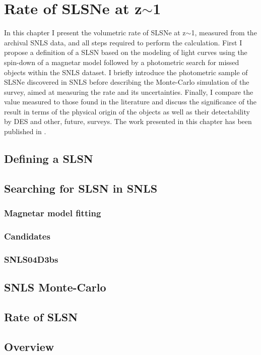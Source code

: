 \chapter{Rate of SLSNe at z$\sim$1} 
\label{Chapter3}

In this chapter I present the volumetric rate of SLSNe at z$\sim$1, measured from the archival SNLS data, and all steps required to perform the calculation. First I propose a definition of a SLSN based on the modeling of light curves using the spin-down of a magnetar model followed by a photometric search for missed objects within the SNLS dataset. I briefly introduce the photometric sample of SLSNe discovered in SNLS before describing the Monte-Carlo simulation of the survey, aimed at measuring the rate and its uncertainties. Finally, I compare the value measured to those found in the literature and discuss the significance of the result in terms of the physical origin of the objects as well as their detectability by DES and other, future, surveys. The work presented in this chapter has been published in \citet{Prajs2016}.

\section{Defining a SLSN}

\section{Searching for SLSN in SNLS}
\subsection{Magnetar model fitting}
\subsection{Candidates}
\subsection{SNLS04D3bs}

\section{SNLS Monte-Carlo}

\section{Rate of SLSN}

\section{Overview}

